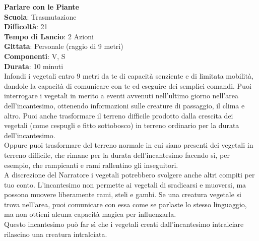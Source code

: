 \begin{multicols}{2}
\medskip\textbf{Parlare con le Piante}\\
\textbf{Scuola}: Trasmutazione\\
\textbf{Difficoltà}: 21\\
\textbf{Tempo di Lancio}: 2 Azioni\\
\textbf{Gittata}: Personale (raggio di 9 metri)\\
\textbf{Componenti}: V, S\\
\textbf{Durata}: 10 minuti\\
Infondi i vegetali entro 9 metri da te di capacità senziente e di limitata mobilità, dandole la capacità di comunicare con te ed eseguire dei semplici comandi. Puoi interrogare i vegetali in merito a eventi avvenuti nell'ultimo giorno nell'area dell'incantesimo, ottenendo informazioni sulle creature di passaggio, il clima e altro. Puoi anche trasformare il terreno difficile prodotto dalla crescita dei vegetali (come cespugli e fitto sottobosco) in terreno ordinario per la durata dell'incantesimo.\\
Oppure puoi trasformare del terreno normale in cui siano presenti dei vegetali in terreno difficile, che rimane per la durata dell'incantesimo facendo sì, per esempio, che rampicanti e rami rallentino gli inseguitori. \\
A discrezione del Narratore i vegetali potrebbero svolgere anche altri compiti per tuo conto. L'incantesimo non permette ai vegetali di sradicarsi e muoversi, ma possono muovere liberamente rami, steli e gambi. Se una creatura vegetale si trova nell'area, puoi comunicare con essa come se parlaste lo stesso linguaggio, ma non ottieni alcuna capacità magica per influenzarla.\\
Questo incantesimo può far sì che i vegetali creati dall'incantesimo intralciare rilascino una creatura intralciata. 


\end{multicols}
